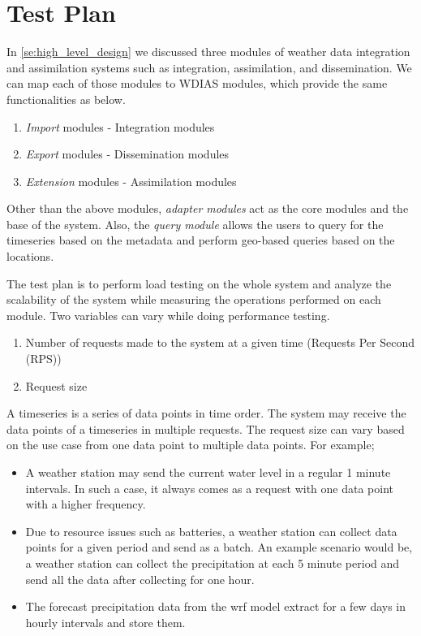 \section{Test Plan}
\label{se:test_plan}

In \cref{se:high_level_design} we discussed three modules of weather data integration and assimilation systems such as integration, assimilation, and dissemination. We can map each of those modules to WDIAS modules, which provide the same functionalities as below.
\begin{enumerate}
    \item \emph{Import} modules - Integration modules
    \item \emph{Export} modules - Dissemination modules
    \item \emph{Extension} modules - Assimilation modules
\end{enumerate}

Other than the above modules, \emph{adapter modules} act as the core modules and the base of the system. Also, the \emph{query module} allows the users to query for the timeseries based on the metadata and perform geo-based queries based on the locations.

The test plan is to perform load testing on the whole system and analyze the scalability of the system while measuring the operations performed on each module. Two variables can vary while doing performance testing.
\begin{enumerate}
    \item Number of requests made to the system at a given time (Requests Per Second (RPS))
    \item Request size
\end{enumerate}

A timeseries is a series of data points in time order. The system may receive the data points of a timeseries in multiple requests. The request size can vary based on the use case from one data point to multiple data points. For example;
\begin{itemize}
    \item A weather station may send the current water level in a regular 1 minute intervals. In such a case, it always comes as a request with one data point with a higher frequency.
    \item Due to resource issues such as batteries, a weather station can collect data points for a given period and send as a batch. An example scenario would be, a weather station can collect the precipitation at each 5 minute period and send all the data after collecting for one hour.
    \item The forecast precipitation data from the \acrshort{wrf} model extract for a few days in hourly intervals and store them.
\end{itemize}

